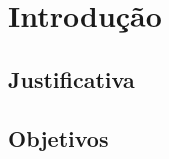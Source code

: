 \chapter{Introdução}
\label{chap:intro}

\section{Justificativa}
\label{sec:justi}

\section{Objetivos}
\label{sec:objt}







